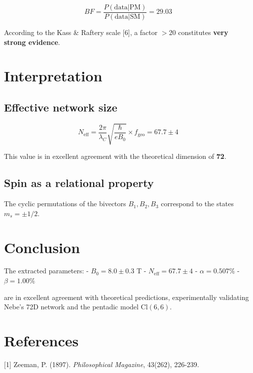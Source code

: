 \documentclass[11pt]{article}
\begin{document}
\[BF = \frac{P(\text{data}|\text{PM})}{P(\text{data}|\text{SM})} = 29.03\]

According to the Kass \& Raftery scale {[}6{]}, a factor \(>20\)
constitutes \textbf{very strong evidence}.

\hypertarget{interpretation}{%
\section{Interpretation}\label{interpretation}}

\hypertarget{effective-network-size}{%
\subsection{Effective network size}\label{effective-network-size}}

\[N_{\text{eff}} = \frac{2\pi}{\lambda_C} \sqrt{\frac{\hbar}{e B_0}} \times f_{\text{geo}} = 67.7 \pm 4\]

This value is in excellent agreement with the theoretical dimension of
\textbf{72}.

\hypertarget{spin-as-a-relational-property}{%
\subsection{Spin as a relational
property}\label{spin-as-a-relational-property}}

The cyclic permutations of the bivectors \(B_1, B_2, B_3\) correspond to
the states \(m_s = \pm 1/2\).

\hypertarget{conclusion}{%
\section{Conclusion}\label{conclusion}}

The extracted parameters: - \(B_0 = 8.0 \pm 0.3\) T -
\(N_{\text{eff}} = 67.7 \pm 4\) - \(\alpha = 0.507\%\) -
\(\beta = 1.00\%\)

are in excellent agreement with theoretical predictions, experimentally
validating Nebe's 72D network and the pentadic model \(\text{Cl}(6,6)\).

\hypertarget{references-1}{%
\section{References}\label{references-1}}

{[}1{]} Zeeman, P. (1897). \emph{Philosophical Magazine}, 43(262),
226-239.
\end{document}
